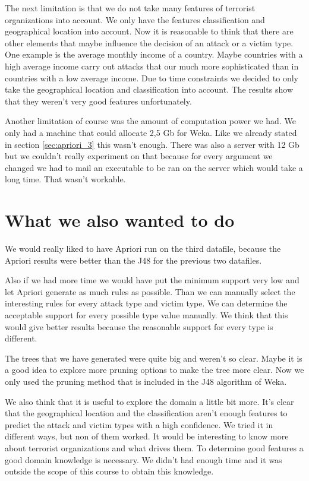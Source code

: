 \documentclass[a4]{article}
\begin{document}
The next limitation is that we do not take many features of terrorist organizations into account. We only have the features classification and geographical location into account. Now it is reasonable to think that there are other elements that maybe influence the decision of an attack or a victim type. One example is the average monthly income of a country. Maybe countries with a high average income carry out attacks that our much more sophisticated than in countries with a low average income. Due to time constraints we decided to only take the geographical location and classification into account. The results show that they weren't very good features unfortunately.\par
Another limitation of course was the amount of computation power we had. We only had a machine that could allocate 2,5 Gb for Weka. Like we already stated in section \ref{sec:apriori_3} this wasn't enough. There was also a server with 12 Gb but we couldn't really experiment on that because for every argument we changed we had to mail an executable to be ran on the server which would take a long time. That wasn't workable.
\section{What we also wanted to do}
We would really liked to have Apriori run on the third datafile, because the Apriori results were better than the J48 for the previous two datafiles.\par Also if we had more time we would have put the minimum support very low and let Apriori generate as much rules as possible. Than we can manually select the interesting rules for every attack type and victim type. We can determine the acceptable support for every possible type value manually. We think that this would give better results because the reasonable support for every type is different.\par
The trees that we have generated were quite big and weren't so clear. Maybe it is a good idea to explore more pruning options to make the tree more clear. Now we only used the pruning method that is included in the J48 algorithm of Weka.\par
We also think that it is useful to explore the domain a little bit more. It's clear that the geographical location and the classification aren't enough features to predict the attack and victim types with a high confidence. We tried it in different ways, but non of them worked. It would be interesting to know more about terrorist organizations and what drives them. To determine good features a good domain knowledge is necessary. We didn't had enough time and it was outside the scope of this course to obtain this knowledge.
\end{document}
